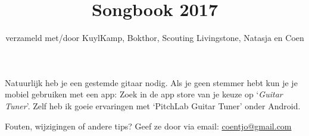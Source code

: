 \documentclass[a4,openany,portrait,tikz]{article}
\title{Songbook 2017}
\author{verzameld met/door KuylKamp, Bokthor, Scouting Livingstone, Natasja en Coen}
\begin{document}

  \maketitle 
  



 




Natuurlijk heb je een gestemde gitaar nodig. Als je geen stemmer hebt kun je je mobiel gebruiken met een app: Zoek in de app store van je keuze op `\emph{Guitar Tuner}'. Zelf heb ik goeie ervaringen met `PitchLab Guitar Tuner' onder Android. 


Fouten, wijzigingen of andere tips? Geef ze door via email:   \href{mailto:coentjo@gmail.com}{coentjo@gmail.com} 





%
\end{document}

